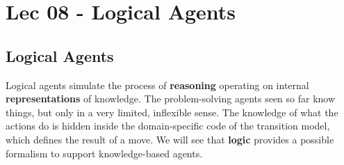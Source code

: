 \chapter{Lec 08 - Logical Agents}
\section{Logical Agents}
Logical agents simulate the process of \textbf{reasoning} operating on internal \textbf{representations} of knowledge. The problem-solving agents seen so far know things, but only in a very limited,
inflexible sense. The knowledge of what the actions do is hidden inside the domain-specific code of the transition model, which defines the result of a move. We will see that \textbf{logic} provides a possible formalism to support knowledge-based agents.

